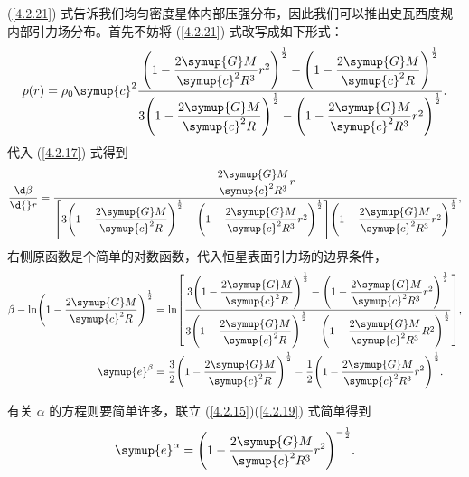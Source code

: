 \documentclass[UTF8, 12pt, a4paper, oneside, onecolumn, fontset=none]{ctexart}
\begin{document}
(\ref{4.2.21}) 式告诉我们均匀密度星体内部压强分布，因此我们可以推出史瓦西度规内部引力场分布。首先不妨将 (\ref{4.2.21}) 式改写成如下形式：
\begin{equation}
p\mleft(r\mright)=\rho_{0}\symup{c}^{2}\frac{\mleft(1-\dfrac{2\symup{G}M}{\symup{c}^{2}R^{3}}r^{2}\mright)^{\frac{1}{2}}-\mleft(1-\dfrac{2\symup{G}M}{\symup{c}^{2}R}\mright)^{\frac{1}{2}}}{3\mleft(1-\dfrac{2\symup{G}M}{\symup{c}^{2}R}\mright)^{\frac{1}{2}}-\mleft(1-\dfrac{2\symup{G}M}{\symup{c}^{2}R^{3}}r^{2}\mright)^{\frac{1}{2}}}.
\end{equation}
代入 (\ref{4.2.17}) 式得到
\begin{equation}
\frac{\d\beta}{\d{}r}=\frac{\dfrac{2\symup{G}M}{\symup{c}^{2}R^{3}}r}{\mleft[3\mleft(1-\dfrac{2\symup{G}M}{\symup{c}^{2}R}\mright)^{\frac{1}{2}}-\mleft(1-\dfrac{2\symup{G}M}{\symup{c}^{2}R^{3}}r^{2}\mright)^{\frac{1}{2}}\mright]\mleft(1-\dfrac{2\symup{G}M}{\symup{c}^{2}R^{3}}r^{2}\mright)^{\frac{1}{2}}},
\end{equation}
右侧原函数是个简单的对数函数，代入恒星表面引力场的边界条件，
\begin{align}
\beta-\ln\mleft(1-\frac{2\symup{G}M}{\symup{c}^{2}R}\mright)^{\frac{1}{2}}&=\ln\mleft[\dfrac{3\mleft(1-\dfrac{2\symup{G}M}{\symup{c}^{2}R}\mright)^{\frac{1}{2}}-\mleft(1-\dfrac{2\symup{G}M}{\symup{c}^{2}R^{3}}r^{2}\mright)^{\frac{1}{2}}}{3\mleft(1-\dfrac{2\symup{G}M}{\symup{c}^{2}R}\mright)^{\frac{1}{2}}-\mleft(1-\dfrac{2\symup{G}M}{\symup{c}^{2}R^{3}}R^{2}\mright)^{\frac{1}{2}}}\mright],\notag\\
\symup{e}^{\beta}&=\frac{3}{2}\mleft(1-\dfrac{2\symup{G}M}{\symup{c}^{2}R}\mright)^{\frac{1}{2}}-\frac{1}{2}\mleft(1-\dfrac{2\symup{G}M}{\symup{c}^{2}R^{3}}r^{2}\mright)^{\frac{1}{2}}.
\end{align}

有关 $\alpha$ 的方程则要简单许多，联立 (\ref{4.2.15})(\ref{4.2.19}) 式简单得到
\begin{equation}
\symup{e}^{\alpha}=\mleft(1-\frac{2\symup{G}M}{\symup{c}^{2}R^{3}}r^{2}\mright)^{-\frac{1}{2}}.
\end{equation}
\end{document}
